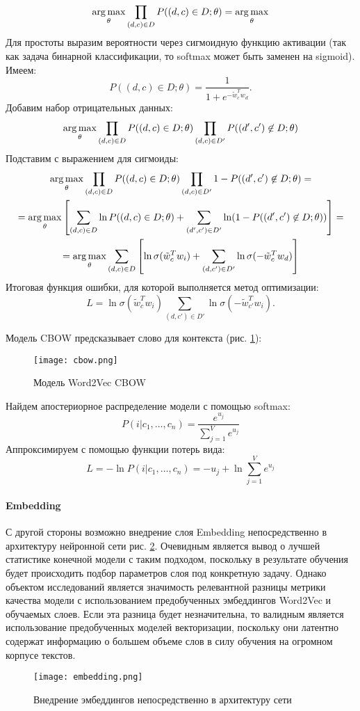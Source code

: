 \[\operatorname*{arg\,max}\limits_{\theta} \prod_{(d,c) \in D} P((d,c) \in D; \theta) = \operatorname*{arg\,max}\limits_{\theta} \]
Для простоты выразим вероятности через сигмоидную функцию активации (так как задача бинарной классификации, то softmax может быть заменен на sigmoid). Имеем:
\[P((d,c) \in D; \theta) = \dfrac{1}{1+e^{-\tilde{w}_c^Tw_d}}.\] Добавим набор отрицательных данных:
\[\operatorname*{arg\,max}\limits_{\theta} \prod_{(d,c)\in D} P((d,c) \in D; \theta) \prod_{(d,c) \in D'}P((d',c') \not \in D; \theta)\]
Подставим с выражением для сигмоиды:
\begin{gather*}
    \operatorname*{arg\,max}\limits_{\theta} \prod_{(d,c)\in D} P((d,c) \in D; \theta) \prod_{(d,c) \in D'} 1-P((d',c') \not \in D; \theta) = \\ 
    = \operatorname*{arg\,max}\limits_{\theta} \left[\sum\limits_{(d,c)\in D} \ln P((d,c)\in D; \theta) + \sum\limits_{(d',c')\in D'} \ln(1-P((d',c')\not \in D; \theta))\right] = \\
    = \operatorname*{arg\,max}\limits_{\theta} \sum\limits_{(d,c)\in D} \left[\ln \sigma(\tilde{w}_c^Tw_i) + \sum\limits_{(d,c')\in D'} \ln \sigma (-\tilde{w}_c^Tw_d)\right] 
\end{gather*}
Итоговая функция ошибки, для которой выполняется метод оптимизации:
\[L = \ln \sigma \left(\tilde{w}_c^Tw_i\right) \sum\limits_{(d,c')\in D'} \ln\sigma(-\tilde{w}_{c'}^Tw_i).\]
\bigskip\par
Модель CBOW предсказывает слово для контекста (рис. \ref{fig:cbow}):
\begin{figure}[H]
    \centering
    \texttt{[image: cbow.png]}
    \caption{Модель Word2Vec CBOW \cite{cbow}}
    \label{fig:cbow}
\end{figure}
Найдем апостериорное распределение модели с помощью softmax:
\[P(i|c_1,\ldots, c_n) = \dfrac{e^{u_j}}{\sum\limits_{j=1}^Ve^{u_j}}\]
Аппроксимируем с помощью функции потерь вида:
\[L = -\ln P(i|c_1,\ldots, c_n) = -u_j + \ln\sum\limits_{j=1}^V e^{u_j}\]
\paragraph{Embedding}
\par
С другой стороны возможно внедрение слоя Embedding непосредственно в архитектуру нейронной сети рис. \ref{fig:embedding}. Очевидным является вывод о лучшей статистике конечной модели с таким подходом, поскольку в результате обучения будет происходить подбор параметров слоя под конкретную задачу. Однако объектом исследований является значимость релевантной разницы метрики качества модели с использованием предобученных эмбеддингов Word2Vec и обучаемых слоев. Если эта разница будет незначительна, то валидным является использование предобученных моделей векторизации, поскольку они латентно содержат информацию о большем объеме слов в силу обучения на огромном корпусе текстов.
\begin{figure}[H]
    \centering
    \texttt{[image: embedding.png]}
    \caption{Внедрение эмбеддингов непосредственно в архитектуру сети}
    \label{fig:embedding}
\end{figure}
